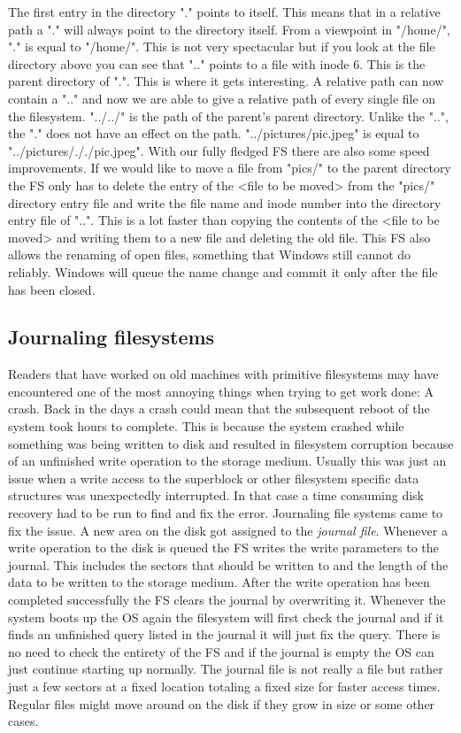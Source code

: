 \begin{enumerate}
The first entry in the directory "." points to itself. This means that in a relative path a "."
will always point to the directory itself. From a viewpoint in "/home/", "." is equal to "/home/".
This is not very spectacular but if you look at the file directory above you can see that ".." points
to a file with inode 6. This is the parent directory of ".". This is where it gets interesting. A
relative path can now contain a ".." and now we are able to give a relative path of every single file
on the filesystem. "../../" is the path of the parent's parent directory. Unlike the "..", the "."
does not have an effect on the path. "../pictures/pic.jpeg" is equal to "../pictures/././pic.jpeg".
With our fully fledged FS there are also some speed improvements. If we would like to move a 
file from "pics/" to the parent directory the FS only has to delete the entry of the <file to be moved> 
from the "pics/" directory entry file and write the file name and inode number into the directory 
entry file of "..". This is a lot faster than copying the contents of the <file to be moved> and
writing them to a new file and deleting the old file. This FS also allows the renaming of open 
files, something that Windows still cannot do reliably. Windows will queue the name change and commit 
it only after the file has been closed.

\subsection{Journaling filesystems}

Readers that have worked on old machines with primitive filesystems may have encountered one of the
most annoying things when trying to get work done: A crash. Back in the days a crash could mean that
the subsequent reboot of the system took hours to complete. This is because the system crashed while
something was being written to disk and resulted in filesystem corruption because of an unfinished
write operation to the storage medium. Usually this was just an issue when a write access to the
superblock or other filesystem specific data structures was unexpectedly interrupted. In that case a
time consuming disk recovery had to be run to find and fix the error. Journaling file systems came to
fix the issue. A new area on the disk got assigned to the \textit{journal file}. Whenever a write operation
to the disk is queued the FS writes the write parameters to the journal. This includes the sectors
that should be written to and the length of the data to be written to the storage medium. After the
write operation has been completed successfully the FS clears the journal by overwriting it. Whenever
the system boots up the OS again the filesystem will first check the journal and if it finds an
unfinished query listed in the journal it will just fix the query. There is no need to check the
entirety of the FS and if the journal is empty the OS can just continue starting up normally.
The journal file is not really a file but rather just a few sectors at a fixed location totaling a
fixed size for faster access times. Regular files might move around on the disk if they grow in size
or some other cases. 
  

\end{enumerate}
